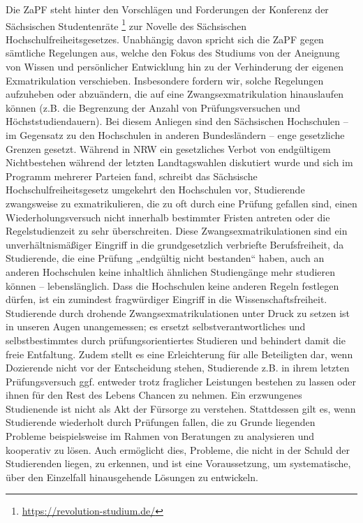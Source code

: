 \documentclass[DIV=calc]{scrartcl}
\begin{document}
Die ZaPF steht hinter den Vorschlägen und Forderungen der Konferenz der Sächsischen Studentenräte \footnote{\url{https://revolution-studium.de/}} zur Novelle des Sächsischen Hochschulfreiheitsgesetzes. Unabhängig davon spricht sich die ZaPF gegen sämtliche Regelungen aus, welche den Fokus des Studiums von der Aneignung von Wissen und persönlicher Entwicklung hin zu der Verhinderung der eigenen Exmatrikulation verschieben. Insbesondere fordern wir, solche Regelungen aufzuheben oder abzuändern, die auf eine Zwangsexmatrikulation hinauslaufen können (z.B. die Begrenzung der Anzahl von Prüfungsversuchen und Höchststudiendauern). Bei diesem Anliegen sind den Sächsischen Hochschulen – im Gegensatz zu den Hochschulen in anderen Bundesländern – enge gesetzliche Grenzen gesetzt. Während in NRW ein gesetzliches Verbot von endgültigem Nichtbestehen während der letzten Landtagswahlen diskutiert wurde und sich im Programm mehrerer Parteien fand, schreibt das Sächsische Hochschulfreiheitsgesetz umgekehrt den Hochschulen vor, Studierende zwangsweise zu exmatrikulieren, die zu oft durch eine Prüfung gefallen sind, einen Wiederholungsversuch nicht innerhalb bestimmter Fristen antreten oder die Regelstudienzeit zu sehr überschreiten.
Diese Zwangsexmatrikulationen sind ein unverhältnismäßiger Eingriff in die grundgesetzlich verbriefte Berufsfreiheit, da Studierende, die eine Prüfung „endgültig nicht bestanden“ haben, auch an anderen Hochschulen keine inhaltlich ähnlichen Studiengänge mehr studieren können – lebenslänglich. Dass die Hochschulen keine anderen Regeln festlegen dürfen, ist ein zumindest fragwürdiger Eingriff in die Wissenschaftsfreiheit.
Studierende durch drohende Zwangsexmatrikulationen unter Druck zu setzen ist in unseren Augen unangemessen; es ersetzt selbstverantwortliches und selbstbestimmtes durch prüfungsorientiertes Studieren und behindert damit die freie Entfaltung.
Zudem stellt es eine Erleichterung für alle Beteiligten dar, wenn Dozierende nicht vor der Entscheidung stehen, Studierende z.B. in ihrem letzten Prüfungsversuch ggf. entweder trotz fraglicher Leistungen bestehen zu lassen oder ihnen für den Rest des Lebens Chancen zu nehmen.
Ein erzwungenes Studienende ist nicht als Akt der Fürsorge zu verstehen. Stattdessen gilt es, wenn Studierende wiederholt durch Prüfungen fallen, die zu Grunde liegenden Probleme beispielsweise im Rahmen von Beratungen zu analysieren und kooperativ zu lösen. Auch ermöglicht dies, Probleme, die nicht in der Schuld der Studierenden liegen, zu erkennen, und ist eine Voraussetzung, um systematische, über den Einzelfall hinausgehende Lösungen zu entwickeln.
\end{document}
